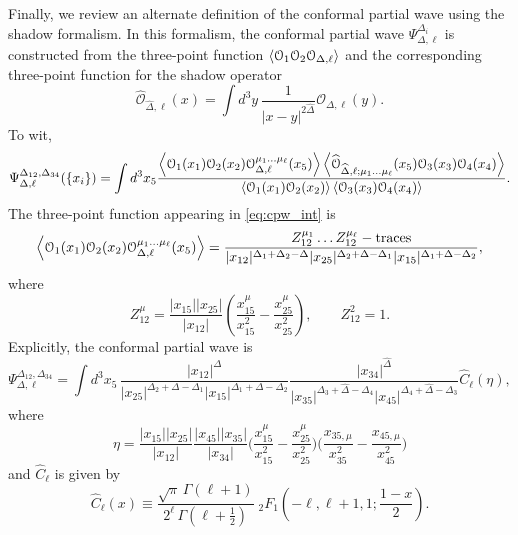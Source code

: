 \documentclass[11pt]{article}
\begin{document}
Finally, we review an alternate definition of the conformal partial wave using the shadow formalism. In this formalism, the conformal partial wave $\Psi_{\Delta,\ell}^{\Delta_{i}}$ is constructed from the three-point function $\expval{ \mathcal{O}_{1}\mathcal{O}_{2}\mathcal{O}_{\Delta,\ell} }$ and the corresponding three-point function for the shadow operator
%
\begin{equation}\label{eq:shadowop}
\widehat{\mathcal{O}}_{\widehat{\Delta},\ell}(x) = \int d^{3}y\, \frac{1}{|x-y|^{2\widehat{\Delta}}}\mathcal{O}_{\Delta,\ell}(y).
\end{equation}
%
To wit,
%
\begin{equation}\label{eq:cpw_int}
\Psi_{\Delta,\ell}^{\Delta_{12},\Delta_{34}}(\{x_{i}\}) = \int d^{3}x_{5}\frac{\expval{\mathcal{O}_{1}(x_{1})\mathcal{O}_{2}(x_{2})\mathcal{O}_{\Delta,\ell}^{\mu_{1} \ldots \mu_{\ell}}(x_{5})}\expval{\widehat{\mathcal{O}}_{\widehat{\Delta},\ell;\mu_{1} \ldots \mu_{\ell}}(x_{5})\mathcal{O}_{3}(x_{3})\mathcal{O}_{4}(x_{4})}}{\expval{\mathcal{O}_{1}(x_{1})\mathcal{O}_{2}(x_{2})} \expval{\mathcal{O}_{3}(x_{3})\mathcal{O}_{4}(x_{4})}}.
\end{equation}
%
The three-point function appearing in \eqref{eq:cpw_int} is
%
\begin{equation}\label{eq:bos3ptfn}
\expval{\mathcal{O}_{1}(x_{1})\mathcal{O}_{2}(x_{2})\mathcal{O}_{\Delta,\ell}^{\mu_{1}\ldots\mu_{\ell}}(x_{5})} = \frac{Z_{12}^{\mu_{1}}\ldots Z_{12}^{\mu_{\ell}} - \mathrm{traces}}{|x_{12}|^{\Delta_{1}+\Delta_{2}-\Delta}|x_{25}|^{\Delta_{2}+\Delta-\Delta_{1}}|x_{15}|^{\Delta_{1}+\Delta-\Delta_{2}}},
\end{equation}
where
%
\begin{equation}\label{eq:spinvar}
Z_{12}^{\mu} = \frac{|x_{15}||x_{25}|}{|x_{12}|}\left(\frac{x_{15}^{\mu}}{x_{15}^2}-\frac{x_{25}^{\mu}}{x_{25}^2}\right), \qquad Z_{12}^2 = 1.
\end{equation}
%
Explicitly, the conformal partial wave is 
%
\begin{equation}\label{eq:cpw_explicit}
\Psi_{\Delta,\ell}^{\Delta_{12},\Delta_{34}} = \int d^{3}x_{5}\,\frac{|x_{12}|^{\Delta}}{|x_{25}|^{\Delta_{2}+\Delta-\Delta_{1}}|x_{15}|^{\Delta_{1}+\Delta-\Delta_{2}}}\frac{|x_{34}|^{\widehat{\Delta}}}{|x_{35}|^{\Delta_{3}+\widehat{\Delta}-\Delta_{4}}|x_{45}|^{\Delta_{4}+\widehat{\Delta}-\Delta_{3}}}\widehat{C}_{\ell}(\eta),
\end{equation}
%
where
%
\begin{equation}\label{eq:shadowinv}
\eta = \frac{|x_{15}||x_{25}|}{|x_{12}|}\frac{|x_{45}||x_{35}|}{|x_{34}|}\bigg(\frac{x_{15}^{\mu}}{x_{15}^2}-\frac{x_{25}^{\mu}}{x_{25}^2}\bigg)\bigg(\frac{x_{35,\mu}}{x_{35}^2}-\frac{x_{45,\mu}}{x_{45}^2}\bigg)
\end{equation}
%
and $\widehat{C}_{\ell}$ is given by
%
\begin{equation}\label{eq:Chat}
\widehat{C}_{\ell}(x) \equiv \frac{\sqrt{\pi} \,\Gamma(\ell+1)}{2^{\ell} \,\Gamma\left(\ell+\frac{1}{2}\right)} \;
		{}_{2}{F}_{1}\left(-\ell,\ell+1,1;\frac{1-x}{2}\right).
\end{equation}
%
\end{document}
